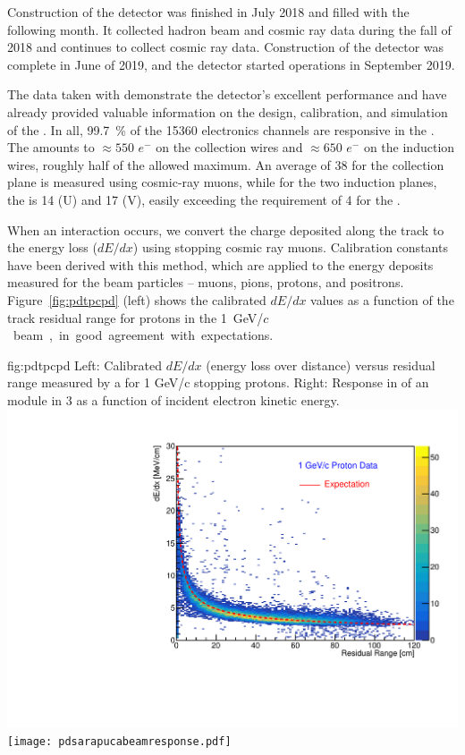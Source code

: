 Construction of the  detector was finished in July 2018 and filled with  the following month. It collected hadron beam and cosmic ray data during the fall of 2018 and continues to collect cosmic ray data.  Construction of the  detector was complete in June of 2019, and the detector started operations in September 2019.

The data taken with  demonstrate the detector's excellent performance and have already provided valuable information on the design, calibration, and simulation of the  . In all, \SI{99.7}{\%}  of the 15360  electronics channels are responsive in the . The  amounts to $\approx 550$ $e^{-}$ on the collection wires and $\approx 650$ $e^{-}$ on the induction wires, roughly half of the allowed maximum. An average  of 38 for the collection plane is measured using cosmic-ray muons, while for the two induction planes, the  is 14 (U) and 17 (V), easily exceeding the requirement of 4 %
for the  . 

When an interaction occurs, we convert the charge deposited along the track to the energy loss ($dE/dx$) using stopping cosmic ray muons. Calibration constants have been derived with this method, which are applied to the energy deposits measured for the beam particles -- muons, pions, protons, and positrons. %
Figure~\ref{fig:pdtpcpd} (left) shows the calibrated $dE/dx$ values as a function of the track residual range for protons in the \SI{1}{GeV/$c$} beam, in good agreement with expectations. 

\begin{dunefigure}
  {fig:pdtpcpd}
  {Left: Calibrated $dE/dx$ (energy loss over distance) versus residual range measured by a  for 1 GeV/c   
  stopping protons. Right: Response in  of an   module in 3 as a function of incident electron kinetic energy.} 
  \includegraphics[width=0.47\linewidth]{graphics/dedx_rr_data_v5}
  \texttt{[image: pdsarapucabeamresponse.pdf]}
\end{dunefigure}
  
